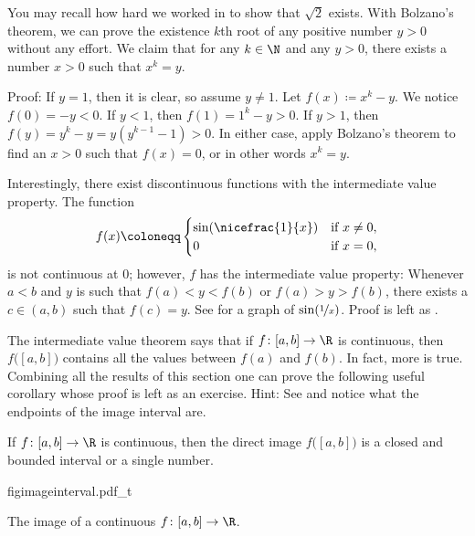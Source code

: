 \begin{example}
You may recall how hard we worked
in 
to show that $\sqrt{2}$ exists.
With Bolzano's
theorem, we can prove the existence $k$th root of any positive number
$y > 0$ without any effort.
We claim that for any $k \in \N$ and any $y > 0$,
there exists a number $x > 0$ such that $x^k = y$.

Proof: If $y=1$, then it is clear, so assume $y\not= 1$.
Let $f(x) \coloneqq x^k - y$.  We notice $f(0) = -y < 0$.
If $y < 1$, then $f(1) = 1^k -y > 0$.  If $y > 1$,
then $f(y) = y^k-y = y(y^{k-1}-1) > 0$.
In either case, apply Bolzano's theorem to find an $x > 0$ such that $f(x) = 0$,
or in other words $x^k = y$.
\end{example}

\begin{example}
Interestingly,
there exist discontinuous functions with
the intermediate value property.
The function
\begin{equation*}
f(x) \coloneqq
\begin{cases}
\sin(\nicefrac{1}{x}) & \text{if } x \not= 0, \\
0 & \text{if } x=0,
\end{cases}
\end{equation*}
is not continuous at $0$; however, $f$ has the intermediate value property:
Whenever $a < b$ and $y$ is such that $f(a) < y < f(b)$
or $f(a) > y > f(b)$,
there exists a $c \in (a,b)$ such that $f(c) = y$.
See  for a graph of $\sin(\nicefrac{1}{x})$.
Proof is left as .
\end{example}

The intermediate value theorem says that if $f \colon [a,b] \to \R$ is
continuous, then $f\bigl([a,b]\bigr)$ contains all the values between $f(a)$ and
$f(b)$.  In fact, more is true.  Combining all the results of this section
one can prove the following useful corollary whose proof is left as an exercise.
Hint: See  and notice what the endpoints of the
image interval are.

\begin{cor} \label{cor:imageofinterval}
If $f \colon [a,b] \to \R$ is continuous, then the direct image
$f\bigl([a,b]\bigr)$
is a closed and bounded interval or a single number.
\end{cor}

\begin{myfigureht}
{figimageinterval.pdf_t}
\caption{The image of a continuous $f \colon [a,b] \to \R$.\label{fig:imageinterval}}
\end{myfigureht}


